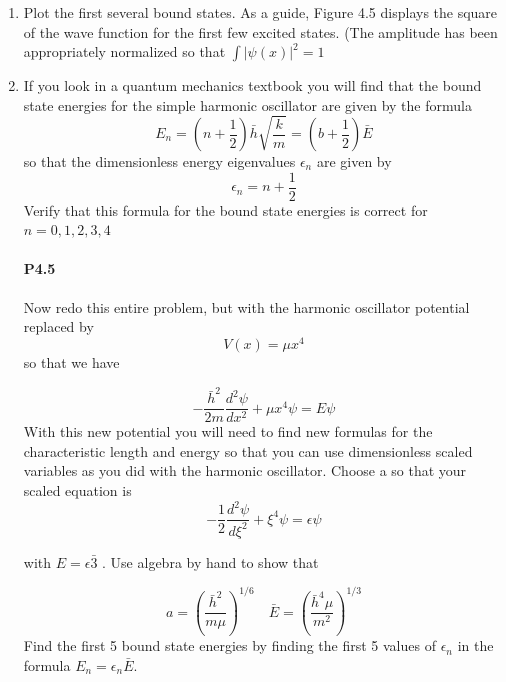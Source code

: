 \documentclass{book}
\theoremstyle{plain}
\theoremstyle{definition}
\numberwithin{exm}{chapter}
\theoremstyle{remark}
\theoremstyle{summary}
\theoremstyle{overview}
\begin{document}
\begin{enumerate}[label=(\alph*)]
\item Plot the first several bound states. As a guide, Figure 4.5 displays the square
of the wave function for the first few excited states. (The amplitude has
been appropriately normalized so that $ \int |ψ(x)|^2 = 1$
\item  If you look in a quantum mechanics textbook you will find that the bound
state energies for the simple harmonic oscillator are given by the formula
\begin{equation}\label{eq:416}
E_n = (n + \frac{1}{2}) \bar{h}\sqrt{\frac{k}{m}} =(b+\frac{1}{2})\bar{E}
\end{equation}
so that the dimensionless energy eigenvalues $\epsilon_n$ are given by
\begin{equation}\label{eq:417}
\epsilon_n = n + \frac{1}{2}
\end{equation}
Verify that this formula for the bound state energies is correct for $n =
0,1,2,3,4$
\paragraph*{P4.5}
Now redo this entire problem, but with the harmonic oscillator potential
replaced by
\begin{equation}\label{eq:418}
V(x)=\mu x^4
\end{equation}
so that we have

\begin{equation}\label{eq:419}
-\frac{\bar{h}^{2}}{2 m} \frac{d^{2} \psi}{d x^{2}}+\mu x^{4} \psi=E \psi
\end{equation}
With this new potential you will need to find new formulas for the characteristic length and energy so that you can use dimensionless scaled variables as
you did with the harmonic oscillator. Choose a so that your scaled equation
is
\begin{equation}\label{eq:420}
- \frac{1}{2} \frac{d^{2} \psi}{d \xi^{2}} + \xi^{4} \psi = \epsilon \psi
\end{equation}

with $E = \epsilon \bar{3}$ . Use algebra by hand to show that

\begin{equation}\label{eq:421}
a=\left(\frac{\bar{h}^{2}}{m \mu}\right)^{1 / 6} \quad \bar{E}=\left(\frac{\bar{h}^{4} \mu}{m^{2}}\right)^{1 / 3}
\end{equation}
Find the first 5 bound state energies by finding the first 5 values of $ \epsilon_n $ in the
formula $E_n =  \epsilon_n \bar{E}$.

\end{enumerate}
\end{document}
